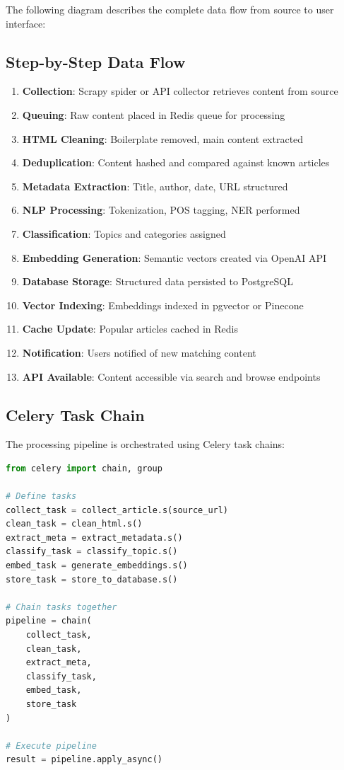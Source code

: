 \documentclass[12pt,a4paper]{report}
\begin{document}
The following diagram describes the complete data flow from source to user interface:

\subsection{Step-by-Step Data Flow}

\begin{enumerate}
    \item \textbf{Collection}: Scrapy spider or API collector retrieves content from source
    \item \textbf{Queuing}: Raw content placed in Redis queue for processing
    \item \textbf{HTML Cleaning}: Boilerplate removed, main content extracted
    \item \textbf{Deduplication}: Content hashed and compared against known articles
    \item \textbf{Metadata Extraction}: Title, author, date, URL structured
    \item \textbf{NLP Processing}: Tokenization, POS tagging, NER performed
    \item \textbf{Classification}: Topics and categories assigned
    \item \textbf{Embedding Generation}: Semantic vectors created via OpenAI API
    \item \textbf{Database Storage}: Structured data persisted to PostgreSQL
    \item \textbf{Vector Indexing}: Embeddings indexed in pgvector or Pinecone
    \item \textbf{Cache Update}: Popular articles cached in Redis
    \item \textbf{Notification}: Users notified of new matching content
    \item \textbf{API Available}: Content accessible via search and browse endpoints
\end{enumerate}

\subsection{Celery Task Chain}

The processing pipeline is orchestrated using Celery task chains:

\begin{lstlisting}[language=Python, caption=Celery Task Chain Example]
from celery import chain, group

# Define tasks
collect_task = collect_article.s(source_url)
clean_task = clean_html.s()
extract_meta = extract_metadata.s()
classify_task = classify_topic.s()
embed_task = generate_embeddings.s()
store_task = store_to_database.s()

# Chain tasks together
pipeline = chain(
    collect_task,
    clean_task,
    extract_meta,
    classify_task,
    embed_task,
    store_task
)

# Execute pipeline
result = pipeline.apply_async()
\end{lstlisting}
\end{document}
